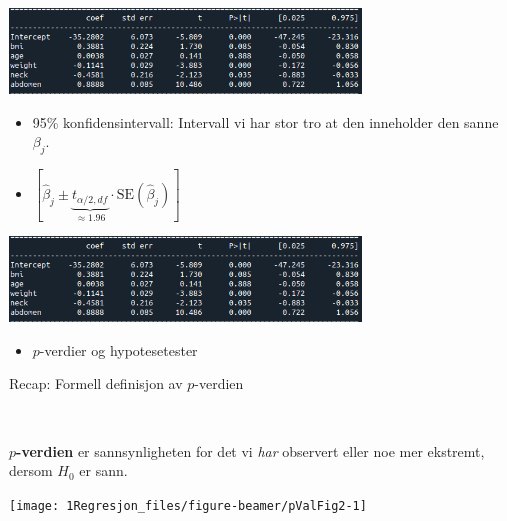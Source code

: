 \documentclass[10pt,ignorenonframetext,]{beamer}
\providecommand{\tightlist}{%
  \setlength{\itemsep}{0pt}\setlength{\parskip}{0pt}}
\begin{document}
\begin{frame}

\includegraphics[width=0.7\textwidth,height=\textheight]{ols_result_all_coefs.png}

\vspace{5mm}

\begin{itemize}
\item
  95\% konfidensintervall: Intervall vi har stor tro at den inneholder
  den sanne \(\beta_j\).
\item
  \([\hat\beta_j \pm \underbrace{t_{\alpha/2,df}}_{\approx 1.96}\cdot \text{SE}(\hat\beta_j)]\)
\end{itemize}

\vspace{20mm}

\end{frame}

\begin{frame}

\includegraphics[width=0.7\textwidth,height=\textheight]{ols_result_all_coefs.png}

\vspace{5mm}

\begin{itemize}
\tightlist
\item
  \(p\)-verdier og hypotesetester
\end{itemize}

\vspace{20mm}

\end{frame}

\begin{frame}

\begin{block}{Recap: Formell definisjon av \(p\)-verdien}

\(~\)

\textbf{\(p\)-verdien} er sannsynligheten for det vi \emph{har}
observert eller noe mer ekstremt, dersom \(H_0\) er sann.

\vspace{5mm}

\begin{center}\texttt{[image: 1Regresjon\_files/figure-beamer/pValFig2-1]} \end{center}

\end{block}

\end{frame}
\end{document}
